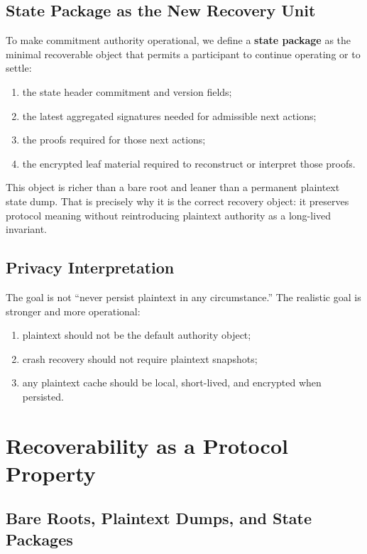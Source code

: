 \documentclass[11pt,a4paper]{article}
\begin{document}
\subsection{State Package as the New Recovery Unit}

To make commitment authority operational, we define a \textbf{state package} as the minimal recoverable object that permits a participant to continue operating or to settle:
\begin{enumerate}
    \item the state header commitment and version fields;
    \item the latest aggregated signatures needed for admissible next actions;
    \item the proofs required for those next actions;
    \item the encrypted leaf material required to reconstruct or interpret those proofs.
\end{enumerate}

This object is richer than a bare root and leaner than a permanent plaintext state dump. That is precisely why it is the correct recovery object: it preserves protocol meaning without reintroducing plaintext authority as a long-lived invariant.

\subsection{Privacy Interpretation}

The goal is not ``never persist plaintext in any circumstance.'' The realistic goal is stronger and more operational:
\begin{enumerate}
    \item plaintext should not be the default authority object;
    \item crash recovery should not require plaintext snapshots;
    \item any plaintext cache should be local, short-lived, and encrypted when persisted.
\end{enumerate}

\section{Recoverability as a Protocol Property}

\subsection{Bare Roots, Plaintext Dumps, and State Packages}
\end{document}
